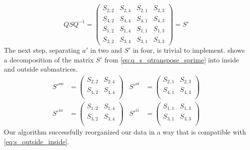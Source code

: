 \begin{equation}
    Q S Q^{-1}
    =
    \begin{pmatrix}
        S_{2,2} & S_{2,4} & S_{2,1} & S_{2,3} \\
        S_{4,2} & S_{4,4} & S_{4,1} & S_{4,3} \\
        S_{1,2} & S_{1,4} & S_{1,1} & S_{1,3} \\
        S_{3,2} & S_{3,4} & S_{3,1} & S_{3,3}
    \end{pmatrix}
    =
    S'
    \label{eq:q_s_qtranspose_sprime}
\end{equation}
The next step, separating $a'$ in two and $S'$ in four, is trivial to implement.
 shows a decomposition of the matrix $S'$ from \cref{eq:q_s_qtranspose_sprime} into inside and outside submatrices.
\begin{equation}
    \begin{aligned}
    S'^{oo}
    &=
    \begin{pmatrix}
        S_{2,2} & S_{2,4}  \\
        S_{4,2} & S_{4,4}  \\
    \end{pmatrix}
    &
    S'^{oi}
    &=
    \begin{pmatrix}
        S_{2,1} & S_{2,3}  \\
        S_{4,1} & S_{4,3}  \\
    \end{pmatrix}
    \\
    S'^{io}
    &=
    \begin{pmatrix}
        S_{1,2} & S_{1,4}  \\
        S_{3,2} & S_{3,4}  \\
    \end{pmatrix}
    &
    S'^{ii}
    &=
    \begin{pmatrix}
        S_{1,1} & S_{1,3}  \\
        S_{3,1} & S_{3,3}  \\
    \end{pmatrix}
    \end{aligned}
    \label{eq:q_s_qtranspose_sprime_decomposed}
\end{equation}
Our algorithm successfully reorganized our data in a way that is compatible with \cref{eq:s_outside_inside}.

